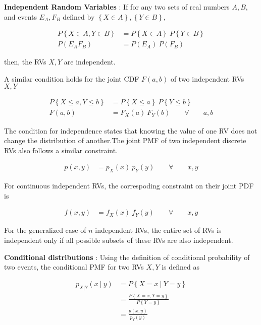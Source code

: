 \textbf{Independent Random Variables} : If for any two sets of real numbers $ A, B$, and events $ E_A, F_B $ defined by $ \left\{ X \in A \right\},  \left\{ Y \in B \right\}$,

\begin{align}
	P \left\{ X \in A, Y \in B \right\} &= P \left\{ X \in A \right\} \ P \left\{ Y \in B \right\} \\
	P(E_A F_B) &= P(E_A)\ P(F_B) \nonumber
\end{align}

then, the RVs $ X, Y$ are independent.

A similar condition holds for the joint CDF $ F(a, b) $ of two independent RVs $ X, Y $

\begin{align}
	P \left\{ X \leq a, Y \leq b \right\} &= P \left\{ X \leq a \right\} \ P \left\{ Y \leq b \right\}  \nonumber \\
	F(a, b) &= F_X(a)\ F_Y(b) \qquad \forall \qquad a, b
\end{align}

The condition for independence states that knowing the value of one RV does not change the distribution of another.The joint PMF of two independent discrete RVs also follows a similar constraint.

\begin{align}
	p(x, y) &= p_X(x)\ p_Y(y) \qquad \forall \qquad x, y
\end{align}

For continuous independent RVs, the correspoding constraint on their joint PDF is

\begin{align}
	f(x, y) &= f_X(x)\ f_Y(y) \qquad \forall \qquad x, y
\end{align}

For the generalized case of $ n $ independent RVs, the entire set of RVs is independent only if all possible subsets of these RVs are also independent.

\textbf{Conditional distributions} : Using the definition of conditional probability of two events, the conditional PMF for two RVs $ X, Y $ is defined as 

\begin{align}
	p_{X|Y}(x\ |\ y) &= P \left\{ X = x\ |\ Y = y \right\} \nonumber\\
	&= \frac{P \left\{ X = x, Y = y \right\}}{P \left\{ Y = y \right\}} \nonumber\\
	&= \frac{p(x, y)}{p_Y(y)}
\end{align}

